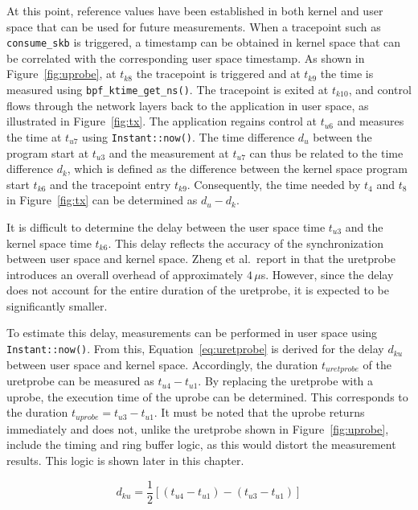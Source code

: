 At this point, reference values have been established in both kernel and user space that can be used for future measurements.  
When a tracepoint such as \texttt{consume\_skb} is triggered, a timestamp can be obtained in kernel space that can be correlated with the corresponding user space timestamp.  
As shown in Figure~\ref{fig:uprobe}, at $t_{k8}$ the tracepoint is triggered and at $t_{k9}$ the time is measured using \texttt{bpf\_ktime\_get\_ns()}.  
The tracepoint is exited at $t_{k10}$, and control flows through the network layers back to the application in user space, as illustrated in Figure~\ref{fig:tx}.  
The application regains control at $t_{u6}$ and measures the time at $t_{u7}$ using \texttt{Instant::now()}.  
The time difference $d_u$ between the program start at $t_{u3}$ and the measurement at $t_{u7}$ can thus be related to the time difference $d_k$, which is defined as the difference between the kernel space program start $t_{k6}$ and the tracepoint entry $t_{k9}$.  
Consequently, the time needed by $t_4$ and $t_8$ in Figure~\ref{fig:tx} can be determined as $d_u - d_k$.  

It is difficult to determine the delay between the user space time $t_{u3}$ and the kernel space time $t_{k6}$.  
This delay reflects the accuracy of the synchronization between user space and kernel space.  
Zheng et al.\ report in \cite{zheng2023bpftimeuserspaceebpfruntime} that the \ac{uretprobe} introduces an overall overhead of approximately $4\,\mu$s.  
However, since the delay does not account for the entire duration of the \ac{uretprobe}, it is expected to be significantly smaller.  

To estimate this delay, measurements can be performed in user space using \texttt{Instant::now()}.  
From this, Equation~\ref{eq:uretprobe} is derived for the delay $d_{ku}$ between user space and kernel space.  
Accordingly, the duration $t_{uretprobe}$ of the \ac{uretprobe} can be measured as $t_{u4} - t_{u1}$.  
By replacing the \ac{uretprobe} with a \ac{uprobe}, the execution time of the \ac{uprobe} can be determined.  
This corresponds to the duration $t_{uprobe} = t_{u3} - t_{u1}$.  
It must be noted that the \ac{uprobe} returns immediately and does not, unlike the \ac{uretprobe} shown in Figure~\ref{fig:uprobe}, include the timing and ring buffer logic, as this would distort the measurement results. 
This logic is shown later in this chapter. 

\begin{equation} \label{eq:uretprobe}
d_{ku} = \frac{1}{2} [(t_{u4} - t_{u1}) - (t_{u3} - t_{u1})]
\end{equation} 


